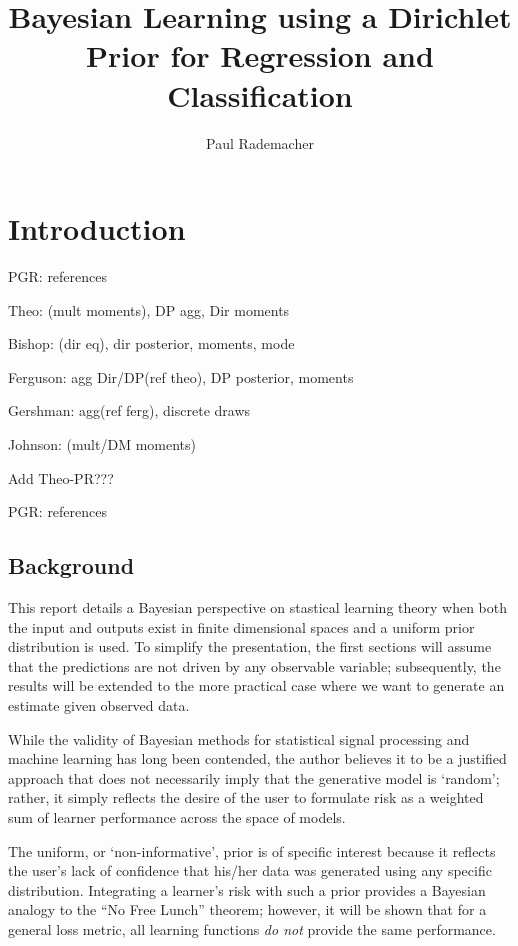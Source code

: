\documentclass[12pt]{report}
\title{Bayesian Learning using a Dirichlet Prior for Regression and Classification}
\author{Paul Rademacher}
\begin{document}
\maketitle
\tableofcontents

\chapter{Introduction}


PGR: references 

Theo: (mult moments), DP agg, Dir moments

Bishop: (dir eq), dir posterior, moments, mode

Ferguson: agg Dir/DP(ref theo), DP posterior, moments

Gershman: agg(ref ferg), discrete draws

Johnson: (mult/DM moments)



Add Theo-PR???

PGR: references


\section{Background}

This report details a Bayesian perspective on stastical learning theory when both the input and outputs exist in finite dimensional spaces and a uniform prior distribution is used. To simplify the presentation, the first sections will assume that the predictions are not driven by any observable variable; subsequently, the results will be extended to the more practical case where we want to generate an estimate given observed data.

While the validity of Bayesian methods for statistical signal processing and machine learning has long been contended, the author believes it to be a justified approach that does not necessarily imply that the generative model is `random'; rather, it simply reflects the desire of the user to formulate risk as a weighted sum of learner performance across the space of models. 

The uniform, or `non-informative', prior is of specific interest because it reflects the user's lack of confidence that his/her data was generated using any specific distribution. Integrating a learner's risk with such a prior provides a Bayesian analogy to the ``No Free Lunch'' theorem; however, it will be shown that for a general loss metric, all learning functions \emph{do not} provide the same performance.
\end{document}
